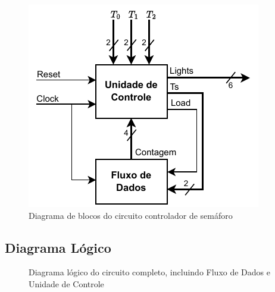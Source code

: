 \documentclass[a4,12pt]{horizon-theme}
\begin{document}
\begin{figure}[!ht]
    \centering
    \includegraphics[width=.65\textwidth]{blocos.pdf}
    \caption{Diagrama de blocos do circuito controlador de semáforo}
    \label{fig:blocos}
\end{figure}


\subsection{Diagrama Lógico}

\begin{figure}[!ht]
    \centering
    \caption{Diagrama lógico do circuito completo, incluindo Fluxo de Dados e Unidade de Controle}
    \label{fig:logico}
\end{figure}
\end{document}

